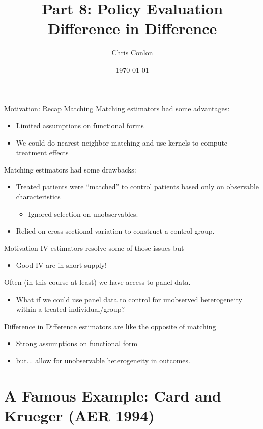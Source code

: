 \documentclass[xcolor=pdftex,dvipsnames,table,mathserif,aspectratio=169]{beamer}
\begin{document}
\title{Part 8: Policy Evaluation\\
 Difference in Difference}
\author{Chris Conlon}
\date{\today}

\frame{\titlepage}

\begin{frame}{Motivation: Recap Matching}
Matching estimators had some advantages:
\begin{itemize}
\item Limited assumptions on \alert{functional forms}
\item We could do nearest neighbor matching and use kernels to compute treatment effects
\end{itemize}
Matching estimators had some drawbacks:
\begin{itemize}
\item Treated patients were ``matched'' to control patients based only on \alert{observable characteristics}
\begin{itemize}
\item Ignored \alert{selection on unobservables}.
\end{itemize}
\item Relied on \alert{cross sectional} variation to construct a control group.
\end{itemize}
\end{frame}


\begin{frame}{Motivation}
IV estimators resolve some of those issues but
\begin{itemize}
\item Good IV are in short supply!
\end{itemize}
 Often (in this course at least) we have access to \alert{panel data}.
\begin{itemize}
\item What if we could use panel data to control for \alert{unobserved heterogeneity} within a treated individual/group?
\end{itemize}
\alert{Difference in Difference} estimators are like the opposite of matching
\begin{itemize}
\item \alert{Strong} assumptions on \alert{functional form}
\item but... allow for \alert{unobservable heterogeneity} in outcomes.
\end{itemize}
\end{frame}


\section{A Famous Example: Card and Krueger (AER 1994)}
\end{document}
